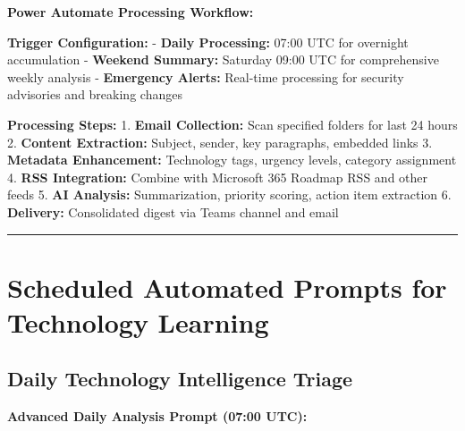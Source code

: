 \documentclass[
  letterpaper,
  DIV=11,
  numbers=noendperiod]{scrartcl}
\begin{document}
\textbf{Power Automate Processing Workflow:}

\textbf{Trigger Configuration:} - \textbf{Daily Processing:} 07:00 UTC
for overnight accumulation - \textbf{Weekend Summary:} Saturday 09:00
UTC for comprehensive weekly analysis - \textbf{Emergency Alerts:}
Real-time processing for security advisories and breaking changes

\textbf{Processing Steps:} 1. \textbf{Email Collection:} Scan specified
folders for last 24 hours 2. \textbf{Content Extraction:} Subject,
sender, key paragraphs, embedded links 3. \textbf{Metadata Enhancement:}
Technology tags, urgency levels, category assignment 4. \textbf{RSS
Integration:} Combine with Microsoft 365 Roadmap RSS and other feeds 5.
\textbf{AI Analysis:} Summarization, priority scoring, action item
extraction 6. \textbf{Delivery:} Consolidated digest via Teams channel
and email

\begin{center}\rule{0.5\linewidth}{0.5pt}\end{center}

\section{Scheduled Automated Prompts for Technology
Learning}\label{scheduled-automated-prompts-for-technology-learning}

\subsection{Daily Technology Intelligence
Triage}\label{daily-technology-intelligence-triage}

\textbf{Advanced Daily Analysis Prompt (07:00 UTC):}
\end{document}
